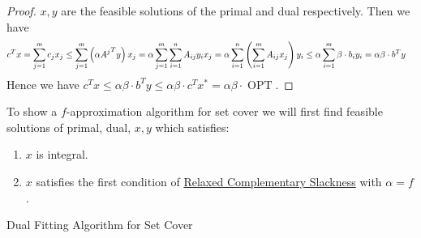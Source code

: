 \begin{proof}
	$x,y$ are the feasible solutions of the primal and dual respectively. Then we have \begin{align*}
        c^Tx & =\sum\limits_{j=1}^m c_jx_j \leq\sum_{j=1}^m \left(\alpha {A^j}^Ty\right)x_j= \alpha\sum_{j=1}^m\sum_{i=1}^n A_{ij}y_ix_j = \alpha\sum_{i=1}^n \left(\sum_{i=1}^m A_{ij}x_j\right)y_i \leq \alpha\sum\limits_{i=1}^m\beta\cdot b_iy_i=\alpha\beta\cdot b^Ty  
    \end{align*}
    Hence we have $c^Tx\leq \alpha\beta\cdot b^Ty\leq \alpha\beta\cdot c^Tx^*=\alpha\beta\cdot \operatorname{OPT}$.
\end{proof}

To show a $f$-approximation algorithm for set cover we will first find  feasible solutions of primal, dual, $x,y$  which satisfies:\begin{enumerate}
    \item $x$ is integral.
    \item $x$ satisfies the first condition of \hyperref[th:relaxed-cs]{Relaxed Complementary Slackness} with $\alpha=f$.
\end{enumerate}

\begin{algorithm}
\DontPrintSemicolon
    \caption{Dual Fitting Algorithm for Set Cover}
\end{algorithm}


